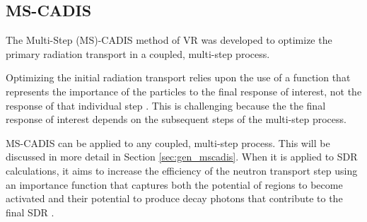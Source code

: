 \subsection{MS-CADIS}\label{sec:mscadis}
The Multi-Step (MS)-CADIS method of VR was developed to optimize the primary
radiation transport in a coupled, multi-step process.  

Optimizing the initial radiation transport
relies upon the use of a function that represents the importance of the particles to the
final response of interest, not the response of that individual step \cite{mscadis}.  
This is challenging because the the final response of interest depends on the subsequent 
steps of the multi-step process.

MS-CADIS can be applied to any coupled, multi-step process.  This will be discussed
in more detail in Section \ref{sec:gen_mscadis}.  When it is applied to
SDR calculations, it aims to increase the efficiency of the neutron transport step
using an importance function that captures both the potential of regions to become 
activated and their potential to produce decay photons that contribute to the final SDR \cite{mscadis}.

